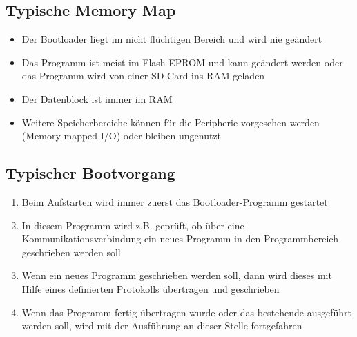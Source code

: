 \begin{minipage}[c]{15cm}
	\subsection{Typische Memory Map}
	\begin{itemize}
		\item Der Bootloader liegt im nicht flüchtigen Bereich und wird nie geändert
		\item Das Programm ist meist im Flash EPROM und kann geändert werden oder das Programm wird von einer SD-Card ins RAM geladen
		\item Der Datenblock ist immer im RAM
		\item Weitere Speicherbereiche können für die Peripherie vorgesehen werden (Memory mapped I/O) oder bleiben ungenutzt
	\end{itemize}
	
	\subsection{Typischer Bootvorgang}
	\begin{enumerate}
		\item Beim Aufstarten wird immer zuerst das Bootloader-Programm gestartet
		\item In diesem Programm wird z.B. geprüft, ob über eine Kommunikationsverbindung ein neues Programm in den Programmbereich geschrieben werden soll 
		\item Wenn ein neues Programm geschrieben werden soll, dann wird dieses mit Hilfe eines definierten Protokolls übertragen und geschrieben 
		\item Wenn das Programm fertig übertragen wurde oder das bestehende ausgeführt werden soll, wird mit der Ausführung an dieser Stelle fortgefahren
	\end{enumerate}
\end{minipage}
\hspace*{0.5cm}
